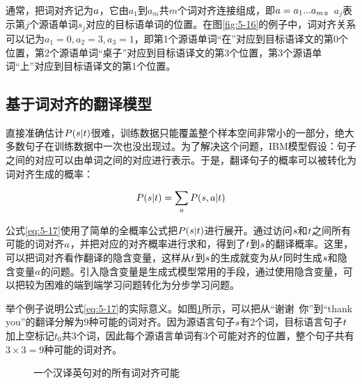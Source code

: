 \parinterval 通常，把词对齐记为${a}$，它由$a_1$到$a_m$共$m$个词对齐连接组成，即${a}=a_1...a_m$。$a_j$表示第$j$个源语单词$s_j$对应的目标语单词的位置。在图\ref{fig:5-16}的例子中，词对齐关系可以记为$a_1=0, a_2=3, a_3=1$，即第1个源语单词“在”对应到目标语译文的第0个位置，第2个源语单词“桌子”对应到目标语译文的第3个位置，第3个源语单词“上”对应到目标语译文的第1个位置。


\subsection{基于词对齐的翻译模型}

\parinterval 直接准确估计${P}({s}|{t})$很难，训练数据只能覆盖整个样本空间非常小的一部分，绝大多数句子在训练数据中一次也没出现过。为了解决这个问题，IBM模型假设：句子之间的对应可以由单词之间的对应进行表示。于是，翻译句子的概率可以被转化为词对齐生成的概率：

\begin{eqnarray}
{P}({s}|{t})= \sum_{{a}}{P}({s},{a}|{t})
\label{eq:5-17}
\end{eqnarray}

\parinterval 公式\eqref{eq:5-17}使用了简单的全概率公式把${P}({s}|{t})$进行展开。通过访问${s}$和${t}$之间所有可能的词对齐${a}$，并把对应的对齐概率进行求和，得到了${t}$到${s}$的翻译概率。这里，可以把词对齐看作翻译的隐含变量，这样从${t}$到${s}$的生成就变为从${t}$同时生成${s}$和隐含变量${a}$的问题。引入隐含变量是生成式模型常用的手段，通过使用隐含变量，可以把较为困难的端到端学习问题转化为分步学习问题。

\parinterval 举个例子说明公式\eqref{eq:5-17}的实际意义。如图\ref{fig:5-17}所示，可以把从“谢谢\ 你”到“thank you”的翻译分解为9种可能的词对齐。因为源语言句子${s}$有2个词，目标语言句子${t}$加上空标记$t_0$共3个词，因此每个源语言单词有3个可能对齐的位置，整个句子共有$3\times3=9$种可能的词对齐。

\begin{figure}[htp]
    \centering

    \caption{一个汉译英句对的所有词对齐可能}
    \label{fig:5-17}
\end{figure}

